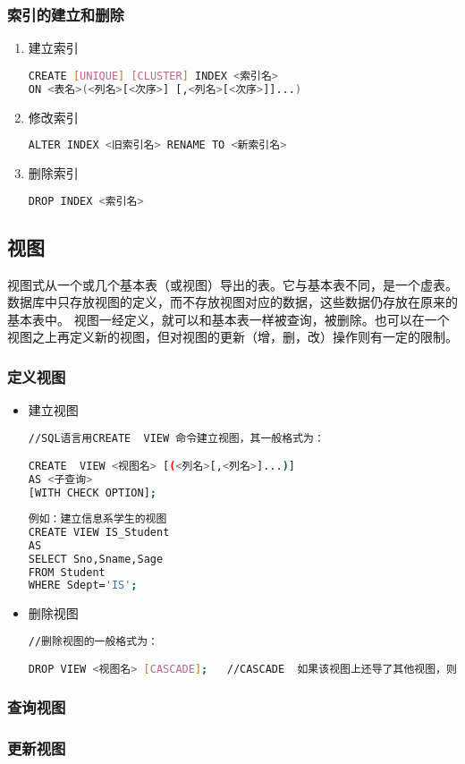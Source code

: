 \subsubsection{索引的建立和删除}
\begin{enumerate}
\item 建立索引
\begin{lstlisting}[language=bash]
CREATE [UNIQUE] [CLUSTER] INDEX <索引名>
ON <表名>(<列名>[<次序>] [,<列名>[<次序>]]...)
\end{lstlisting}
\item 修改索引
\begin{lstlisting}[language=bash]
ALTER INDEX <旧索引名> RENAME TO <新索引名>
\end{lstlisting}
\item  删除索引
\begin{lstlisting}[language=bash]
DROP INDEX <索引名>
\end{lstlisting}
\end{enumerate}

\subsection{视图}
视图式从一个或几个基本表（或视图）导出的表。它与基本表不同，是一个虚表。数据库中只存放视图的定义，而不存放视图对应的数据，这些数据仍存放在原来的基本表中。
视图一经定义，就可以和基本表一样被查询，被删除。也可以在一个视图之上再定义新的视图，但对视图的更新（增，删，改）操作则有一定的限制。
\subsubsection{定义视图}
\begin{itemize}
\item 建立视图
\begin{lstlisting}[language=bash]
//SQL语言用CREATE  VIEW 命令建立视图，其一般格式为：

CREATE  VIEW <视图名> [(<列名>[,<列名>]...)]
AS <子查询>
[WITH CHECK OPTION];
\end{lstlisting}

\begin{lstlisting}[language=bash]
例如：建立信息系学生的视图
CREATE VIEW IS_Student
AS
SELECT Sno,Sname,Sage
FROM Student
WHERE Sdept='IS';
\end{lstlisting}


\item 删除视图
\begin{lstlisting}[language=bash]
//删除视图的一般格式为：

DROP VIEW <视图名> [CASCADE];   //CASCADE  如果该视图上还导了其他视图，则shi


\end{lstlisting}


\end{itemize}
\subsubsection{查询视图}
\subsubsection{更新视图}